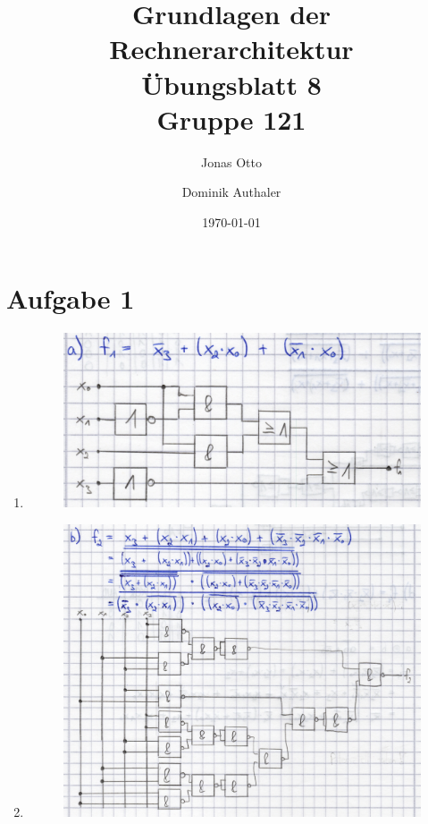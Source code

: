 \documentclass[a4paper]{article}
\title{Grundlagen der Rechnerarchitektur\\ Übungsblatt 8\\Gruppe 121\\}
\author{Jonas Otto\and Dominik Authaler}
\date{\today}
\begin{document}
\maketitle

\section*{Aufgabe 1}
\begin{enumerate}[label=\alph*)]
	\item
	\begin{figure}[h!]
		\begin{center}
			\includegraphics[scale=0.25]{Aufgabe1a.png}
		\end{center}
	\end{figure} 
	\item 
	\begin{figure}[h!]
		\begin{center}
			\includegraphics[scale=0.3]{Aufgabe1b.png}

\end{center}
\end{figure}
\end{enumerate}
\end{document}
